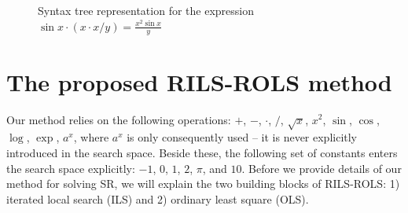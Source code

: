 \documentclass{bmcart}
\begin{document}
	\begin{figure}[!ht]
	\centering
	
	\caption{Syntax tree representation for the expression $\sin{x} \cdot   ( x \cdot  x / y  )  = \frac{x^2 \sin x }{y}$}
	\label{fig:syntax-tree-example}
\end{figure}

	\section{The proposed RILS-ROLS method}\label{sec:rils}

Our method relies on the following operations: $+$, $-$, $\cdot$, $/$, $\sqrt{x}$, $x^2 $, $\sin$, $\cos$, $\log$, $\exp$, $a^x$, where $a^x$ is only consequently used -- it is never explicitly introduced in the search space. Beside these, the following set of constants enters the search space explicitly: $-1$, $0$, $1$, $2$, $\pi$, and $10$. 
Before we provide details of our method for solving SR, we will explain the two building blocks of \textsc{RILS-ROLS}: 1) iterated local search (ILS) and 2) ordinary least square (OLS). 
\end{document}
